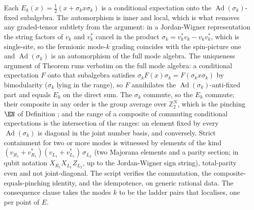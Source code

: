 Each $E_k(x) = \tfrac12(x + \sigma_k x \sigma_k)$ is a conditional expectation onto the $\operatorname{Ad}(\sigma_k)$-fixed subalgebra. The automorphism is inner and local, which is what removes any graded-tensor subtlety from the argument: in a Jordan-Wigner representation the string factors of $v_k$ and $v_k^{*}$ cancel in the product $\sigma_k = v_k^{*}v_k - v_k v_k^{*}$, which is single-site, so the fermionic mode-$k$ grading coincides with the spin-picture one and $\operatorname{Ad}(\sigma_k)$ is an automorphism of the full mode algebra. The uniqueness argument of Theorem  runs verbatim on the full mode algebra: a conditional expectation $F$ onto that subalgebra satisfies $\sigma_k F(x)\sigma_k = F(\sigma_k x \sigma_k)$ by bimodularity ($\sigma_k$ lying in the range), so $F$ annihilates the $\operatorname{Ad}(\sigma_k)$-anti-fixed part and equals $E_k$ on the direct sum. The $\sigma_k$ commute, so the $E_k$ commute; their composite in any order is the group average over $\mathbb{Z}_2^{N}$, which is the pinching $\EN$ of Definition ; and the range of a composite of commuting conditional expectations is the intersection of the ranges: an element fixed by every $\operatorname{Ad}(\sigma_k)$ is diagonal in the joint number basis, and conversely. Strict containment for two or more modes is witnessed by elements of the kind $(v_{R_1} + v_{R_1}^{*})(v_{L_1} + v_{L_1}^{*})\,\sigma_{L_2}$ (two Majorana elements and a parity section; in qubit notation $X_{R_1}X_{L_1}Z_{L_2}$, up to the Jordan-Wigner sign string), total-parity even and not joint-diagonal. The script verifies the commutation, the composite-equals-pinching identity, and the idempotence, on generic rational data. The consequence clause takes the modes $k$ to be the ladder pairs that  localises, one per point of $E$.
